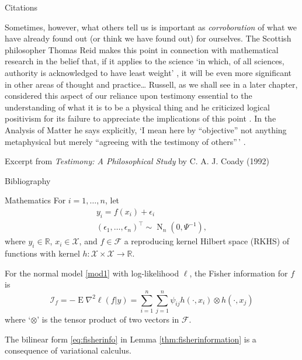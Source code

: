 \documentclass[,aspectratio=43]{beamer}
\DeclareMathOperator{\E}{E}
\DeclareMathOperator{\N}{N}
\newcommand{\bbR}{\mathbb{R}}
\newcommand{\cI}{{\mathcal I}}
\begin{document}
\begin{frame}{Citations}
\protect\hypertarget{citations}{}
\justifying

Sometimes, however, what others tell us is important as
\emph{corroboration} of what we have already found out (or think we have
found out) for ourselves. The Scottish philosopher Thomas Reid makes
this point in connection with mathematical research in the belief that,
if it applies to the science `in which, of all sciences, authority is
acknowledged to have least weight' \cite{reid2002thomas}, it will be
even more significant in other areas of thought and practice\ldots
Russell, as we shall see in a later chapter, considered this aspect of
our reliance upon testimony essential to the understanding of what it is
to be a physical thing and he criticized logical positivism for its
failure to appreciate the implications of this point
\cite{russell2007logic}. In the Analysis of Matter he says explicitly,
`I mean here by ``objective'' not anything metaphysical but merely
``agreeing with the testimony of others''\,' \cite{russell2015analysis}.

\vspace{1em}

Excerpt from \emph{Testimony: A Philosophical Study} by C. A. J. Coady
(1992)
\end{frame}

\begin{frame}{Bibliography}
\protect\hypertarget{bibliography}{}
\nocite{coady1992testimony} \printbibliography[heading=none]
\end{frame}

\begin{frame}{Mathematics}
\protect\hypertarget{mathematics}{}
For \(i=1,\dots,n\), let \begin{equation}\label{mod1}
\begin{gathered}
y_i = f(x_i) + \epsilon_i \\
(\epsilon_1,\dots,\epsilon_n)^\top \sim \N_n(0, \Psi^{-1}),
\end{gathered}
\end{equation} where \(y_i\in\bbR\), \(x_i\in\mathcal X\), and
\(f\in\mathcal F\) a reproducing kernel Hilbert space (RKHS) of
functions with kernel \(h:\mathcal X \times \mathcal X \to \mathbb R\).

\begin{lemma}
\label{thm:fisherinformation} For the normal model \eqref{mod1} with
log-likelihood \(\ell\), the Fisher information for \(f\) is
\begin{equation}
\cI_f = -\E\nabla^2 \ell(f|y) = \sum_{i=1}^n\sum_{j=1}^n \psi_{ij}h(\cdot,x_i) \otimes h(\cdot,x_j) \label{eq:fisherinfo}
\end{equation} where `\(\otimes\)' is the tensor product of two vectors
in \(\mathcal F\).
\end{lemma}

The bilinear form \eqref{eq:fisherinfo} in Lemma
\ref{thm:fisherinformation} is a consequence of variational calculus.
\end{frame}
\end{document}
